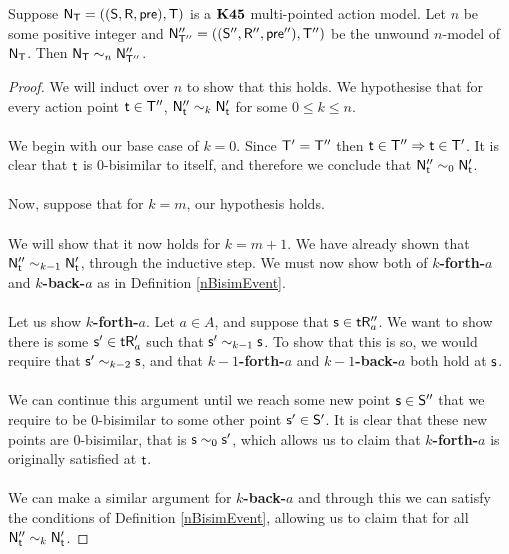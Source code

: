 \begin{lemma} \label{lemma:unwoundNModelNBisimilar}
  Suppose $\mathrm{\mathsf{N}}_\mathrm{\mathsf{T}} = ((\mathrm{\mathsf{S}},\mathrm{\mathsf{R}},\mathrm{\mathsf{pre}}),\mathrm{\mathsf{T}})$ is a $\bf K45$ multi-pointed
  action model.
  Let $n$ be some positive integer and $\mathrm{\mathsf{N}}''_{\mathrm{\mathsf{T}}''} = ((\mathrm{\mathsf{S}}'',\mathrm{\mathsf{R}}'',\mathrm{\mathsf{pre}}''),\mathrm{\mathsf{T}}'')$ be the
	unwound $n$-model of $\mathrm{\mathsf{N}}_\mathrm{\mathsf{T}}$.
  Then $\mathrm{\mathsf{N}}_\mathrm{\mathsf{T}} \sim_n \mathrm{\mathsf{N}}''_{\mathrm{\mathsf{T}}''}$.
\end{lemma}
\begin{proof}
	We will induct over $n$ to show that this holds.
	We hypothesise that for every action point $\mathrm{\mathsf{t}} \in \mathrm{\mathsf{T}}''$, $\mathrm{\mathsf{N}}''_\mathrm{\mathsf{t}} \sim_k \mathrm{\mathsf{N}}'_{\mathrm{\mathsf{t}}}$
	for some $0 \leq k \leq n$.\\
	\\
	We begin with our base case of $k = 0$.
	Since $\mathrm{\mathsf{T}}' = \mathrm{\mathsf{T}}''$ then $\mathrm{\mathsf{t}} \in \mathrm{\mathsf{T}}'' \Rightarrow \mathrm{\mathsf{t}} \in \mathrm{\mathsf{T}}'$.
	It is clear that $\mathrm{\mathsf{t}}$ is $0$-bisimilar to itself, and therefore we conclude that $\mathrm{\mathsf{N}}''_\mathrm{\mathsf{t}}
	\sim_0 \mathrm{\mathsf{N}}'_\mathrm{\mathsf{t}}$.\\
	\\
	Now, suppose that for $k = m$, our hypothesis holds.\\
	\\
	We will show that it now holds for $k = m+1$.
	We have already shown that $\mathrm{\mathsf{N}}''_\mathrm{\mathsf{t}} \sim_{k-1} \mathrm{\mathsf{N}}'_\mathrm{\mathsf{t}}$, through the inductive step.
	We must now show both of {\bf $k$-forth-$a$} and {\bf $k$-back-$a$} as in Definition
	\ref{nBisimEvent}.\\
	\\
	Let us show {\bf $k$-forth-$a$}.
	Let $a \in A$, and suppose that $\mathrm{\mathsf{s}} \in \mathrm{\mathsf{t}} \mathrm{\mathsf{R}}''_a$.
	We want to show there is some $\mathrm{\mathsf{s}}' \in \mathrm{\mathsf{t}} \mathrm{\mathsf{R}}'_a$ such that $\mathrm{\mathsf{s}}' \sim_{k-1} \mathrm{\mathsf{s}}$.
	To show that this is so, we would require that $\mathrm{\mathsf{s}}' \sim_{k-2} \mathrm{\mathsf{s}}$, and that {\bf
	$k-1$-forth-$a$} and {\bf $k-1$-back-$a$} both hold at $\mathrm{\mathsf{s}}$.\\
	\\
	We can continue this argument until we reach some new point $\mathrm{\mathsf{s}} \in \mathrm{\mathsf{S}}''$ that we require to be
	$0$-bisimilar to some other point $\mathrm{\mathsf{s}}' \in \mathrm{\mathsf{S}}'$.
	It is clear that these new points are 0-bisimilar, that is $\mathrm{\mathsf{s}} \sim_0 \mathrm{\mathsf{s}}'$, which allows us to
	claim that {\bf $k$-forth-$a$} is originally satisfied at $\mathrm{\mathsf{t}}$.\\
	\\
	We can make a similar argument for {\bf $k$-back-$a$} and through this we can satisfy the
	conditions of Definition \ref{nBisimEvent}, allowing us to claim that for all $\mathrm{\mathsf{N}}''_\mathrm{\mathsf{t}} \sim_k
	\mathrm{\mathsf{N}}'_{\mathrm{\mathsf{t}}}$.
\end{proof}

